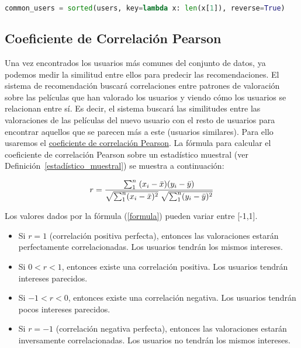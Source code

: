 \documentclass{uimppracticas}
\begin{document}
\begin{lstlisting}[language=python, basicstyle=\small]
common_users = sorted(users, key=lambda x: len(x[1]), reverse=True)
\end{lstlisting}

\subsection{Coeficiente de Correlación Pearson}\label{correlacion_pearson}

Una vez encontrados los usuarios más comunes del conjunto de datos, ya podemos medir la similitud entre ellos para predecir las recomendaciones. El sistema de recomendación buscará correlaciones entre patrones de valoración sobre las películas que han valorado los usuarios y viendo cómo los usuarios se relacionan entre sí. Es decir, el sistema buscará las similitudes entre las valoraciones de las películas del nuevo usuario con el resto de usuarios para encontrar aquellos que se parecen más a este (usuarios similares). Para ello usaremos el \href{https://es.wikipedia.org/wiki/Coeficiente_de_correlaci\%C3\%B3n_de_Pearson}{coeficiente de correlación Pearson}. La fórmula para calcular el coeficiente de correlación Pearson sobre un estadístico muestral (ver Definición~\ref{estadístico_muestral}) se muestra a continuación:

\begin{equation}\label{formula}
	\large r = \frac{\sum_{1}^{n} \; (x_{i} - \bar{x}) (y_{i} - \bar{y})}{\sqrt{\sum_{1}^{n}(x_{i} - \bar{x})^2} \; \sqrt{\sum_{1}^{n}(y_{i} - \bar{y})^2}}
\end{equation}

Los valores dados por la fórmula (\ref{formula}) pueden variar entre [-1,1].

\begin{itemize}
	\item Si $r=1$ (correlación positiva perfecta), entonces las valoraciones estarán perfectamente correlacionadas. Los usuarios tendrán los mismos intereses.
	\item Si $0<r<1$, entonces existe una correlación positiva. Los usuarios tendrán intereses parecidos.
	\item Si $-1<r<0$, entonces existe una correlación negativa. Los usuarios tendrán pocos intereses parecidos.
	\item Si $r=-1$ (correlación negativa perfecta), entonces las valoraciones estarán inversamente correlacionadas. Los usuarios no tendrán los mismos intereses.
\end{itemize}
\end{document}
